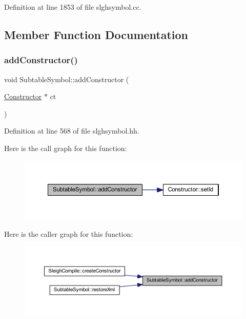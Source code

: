Definition at line 1853 of file slghsymbol.\+cc.



\subsection{Member Function Documentation}
\mbox{\label{class_subtable_symbol_aad4e50c5bc9f1f80c3e8077557568778}} 
\subsubsection{\texorpdfstring{addConstructor()}{addConstructor()}}
{\footnotesize\ttfamily void Subtable\+Symbol\+::add\+Constructor (\begin{DoxyParamCaption}\item[{\mbox{\hyperlink{class_constructor}{Constructor}} $\ast$}]{ct }\end{DoxyParamCaption})\hspace{0.3cm}{\ttfamily [inline]}}



Definition at line 568 of file slghsymbol.\+hh.

Here is the call graph for this function\+:
\nopagebreak
\begin{figure}[H]
\begin{center}
\leavevmode
\includegraphics[width=350pt]{class_subtable_symbol_aad4e50c5bc9f1f80c3e8077557568778_cgraph}
\end{center}
\end{figure}
Here is the caller graph for this function\+:
\nopagebreak
\begin{figure}[H]
\begin{center}
\leavevmode
\includegraphics[width=350pt]{class_subtable_symbol_aad4e50c5bc9f1f80c3e8077557568778_icgraph}
\end{center}
\end{figure}
\mbox{\label{class_subtable_symbol_a35fa0a80443d8ca5f269c0fc31523625}} 
